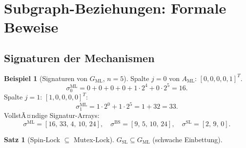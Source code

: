 ﻿\documentclass[a4paper,12pt]{article}
\theoremstyle{definition}
\newtheorem{beispiel}{Beispiel}
\newtheorem{satz}{Satz}
\begin{document}
\section{Subgraph-Beziehungen: Formale Beweise}
\label{sec:beweise}

\subsection{Signaturen der Mechanismen}

\begin{beispiel}[Signaturen von $G_{\mathrm{ML}}$, $n=5$]
Spalte $j=0$ von $A_{\mathrm{ML}}$: $[0,0,0,0,1]^T$.
\[
  \sigma_0^{\mathrm{ML}} = 0{+}0{+}0{+}0{+}1\cdot2^4 + 0\cdot2^5
  = 16.
\]
Spalte $j=1$: $[1,0,0,0,0]^T$:
\[
  \sigma_1^{\mathrm{ML}} = 1\cdot2^0 + 1\cdot2^5 = 1 + 32 = 33.
\]
VollstÃ¤ndige Signatur-Arrays:
\[
  \sigma^{\mathrm{ML}} = [16,\,33,\,4,\,10,\,24],\quad
  \sigma^{\mathrm{BS}} = [9,\,5,\,10,\,24],\quad
  \sigma^{\mathrm{SL}} = [2,\,9,\,0].
\]
\end{beispiel}

\begin{satz}[Spin-Lock $\subseteq$ Mutex-Lock]
\label{satz:sl_ml}
$G_{\mathrm{SL}} \subseteq G_{\mathrm{ML}}$ (schwache Einbettung).
\end{satz}
\end{document}
